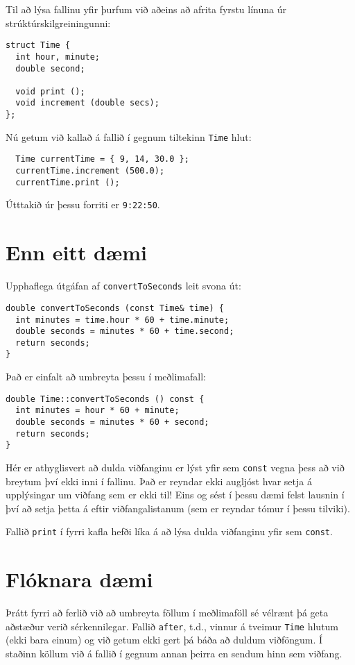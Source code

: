 {Til að lýsa fallinu yfir þurfum við aðeins að afrita fyrstu línuna úr strúktúrskilgreiningunni:

\begin{verbatim}
struct Time {
  int hour, minute;
  double second;

  void print ();
  void increment (double secs);
};
\end{verbatim}
%
Nú getum við kallað á fallið í gegnum tiltekinn {\tt Time} hlut:

\begin{verbatim}
  Time currentTime = { 9, 14, 30.0 };
  currentTime.increment (500.0);
  currentTime.print ();
\end{verbatim}
%
Útttakið úr þessu forriti er {\tt 9:22:50}.

\section{Enn eitt dæmi}

Upphaflega útgáfan af {\tt convertToSeconds} leit svona út:

\begin{verbatim}
double convertToSeconds (const Time& time) {
  int minutes = time.hour * 60 + time.minute;
  double seconds = minutes * 60 + time.second;
  return seconds;
}
\end{verbatim}
%
Það er einfalt að umbreyta þessu í meðlimafall: 

\begin{verbatim}
double Time::convertToSeconds () const {
  int minutes = hour * 60 + minute;
  double seconds = minutes * 60 + second;
  return seconds;
}
\end{verbatim}
%
Hér er athyglisvert að dulda viðfanginu er lýst yfir sem 
{\tt const} vegna þess að við breytum því ekki inni í fallinu. 
Það er reyndar ekki augljóst hvar setja á upplýsingar um viðfang sem er ekki til!
Eins og sést í þessu dæmi felst lausnin í því að setja þetta á eftir viðfangalistanum (sem er reyndar tómur í þessu tilviki).

Fallið {\tt print} í fyrri kafla hefði líka á að lýsa dulda viðfanginu yfir sem {\tt const}.

\section {Flóknara dæmi}

Þrátt fyrri að ferlið við að umbreyta föllum í meðlimaföll sé vélrænt þá geta aðstæður verið sérkennilegar.
Fallið {\tt after}, t.d., vinnur á tveimur {\tt Time} hlutum (ekki bara einum) og við getum ekki gert þá báða að duldum viðföngum.
Í staðinn köllum við á fallið í gegnum annan þeirra en sendum hinn sem viðfang.

}
